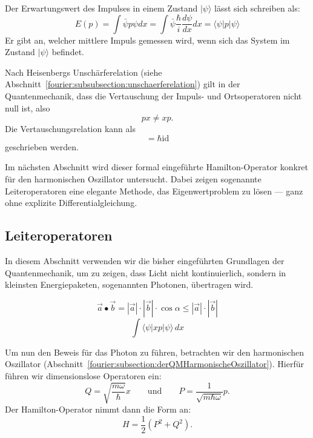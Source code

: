 Der Erwartungswert des Impulses in einem Zustand $|\psi\rangle$ lässt sich schreiben als:
\begin{equation}
	E(p) = \int \bar{\psi}p\psi dx
	= \int \bar{\psi} \frac{\hbar}{i} \frac{d\psi}{dx} dx
	= \langle \psi | p | \psi \rangle
\end{equation}
Er gibt an, welcher mittlere Impuls gemessen wird, wenn sich das System im Zustand $|\psi\rangle$ befindet.

Nach Heisenbergs Unschärferelation (siehe Abschnitt~\ref{fourier:subsubsection:unschaerferelation}) gilt in der Quantenmechanik, dass die Vertauschung der Impuls- und Ortsoperatoren nicht null ist, also
\begin{equation}
	px \neq xp.
\end{equation}
Die Vertauschungsrelation kann als
\begin{equation}
	[x, p] = \hbar \text{id}
\end{equation}
geschrieben werden.


		Im nächsten Abschnitt wird dieser formal eingeführte Hamilton-Operator konkret für den harmonischen Oszillator untersucht.
		Dabei zeigen sogenannte Leiteroperatoren eine elegante Methode, das Eigenwertproblem zu lösen — ganz ohne explizite Differentialgleichung.

	\subsection{Leiteroperatoren\label{fourier:subsection:Leiteroperatoren}} %
In diesem Abschnitt verwenden wir die bisher eingeführten Grundlagen der Quantenmechanik, um zu zeigen, dass Licht nicht kontinuierlich, sondern in kleinsten Energiepaketen, sogenannten Photonen, übertragen wird.

\begin{equation}
	\vec{a}\bullet\vec{b} = |\vec{a}| \cdot |\vec{b}| \cdot \cos{\alpha} \leq |\vec{a}| \cdot |\vec{b}|
\end{equation}
\begin{equation}
	\int \langle \psi |xp|\psi \rangle\,dx	%
\end{equation}

Um nun den Beweis für das Photon zu führen, betrachten wir den harmonischen Oszillator (Abschnitt~\ref{fourier:subsection:derQMHarmonischeOszillator}).
Hierfür führen wir dimensionslose Operatoren ein:
\[ 
Q = \sqrt{\frac{m\omega}{\hbar}}x
\qquad\text{und}\qquad
P = \frac{1}{\sqrt{m\hbar\omega}}p.
\]
Der Hamilton-Operator nimmt dann die Form an:
\begin{equation}
	H = \frac{1}{2}(P^2 + Q^2).
\end{equation}

